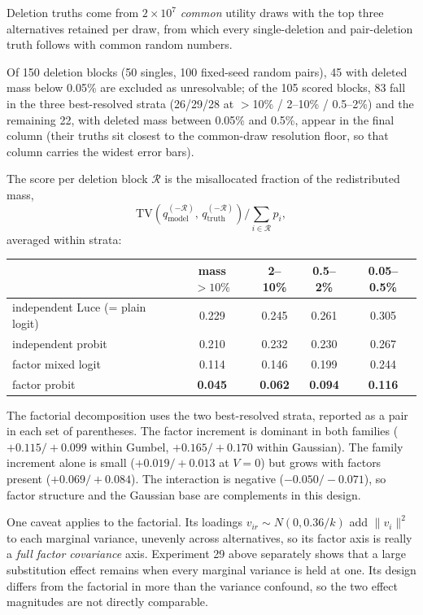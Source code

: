 \documentclass[12pt]{article}
\theoremstyle{remark}
\begin{document}
Deletion truths come from $2\times10^7$ \emph{common} utility draws with
the top three alternatives retained per draw, from which every
single-deletion and pair-deletion truth follows with common random numbers.

Of 150 deletion blocks (50 singles, 100 fixed-seed random pairs), 45 with
deleted mass below 0.05\% are excluded as unresolvable; of the 105 scored
blocks, 83 fall in the three best-resolved strata (26/29/28 at $>$10\% /
2--10\% / 0.5--2\%) and the remaining 22, with deleted mass between
0.05\% and 0.5\%, appear in the final column (their truths sit closest to
the common-draw resolution floor, so that column carries the widest error
bars).

The score per deletion block $\mathcal{R}$ is the
misallocated fraction of the redistributed mass,
\[
\mathrm{TV}\!\left(q^{(-\mathcal{R})}_{\mathrm{model}},\,
q^{(-\mathcal{R})}_{\mathrm{truth}}\right) \Big/ \textstyle\sum_{i \in \mathcal{R}} p_i ,
\]
averaged within strata:

\begin{center}
\begin{tabular}{lcccc}
\toprule
 & mass $>10\%$ & 2--10\% & 0.5--2\% & 0.05--0.5\% \\
\midrule
independent Luce (= plain logit) & 0.229 & 0.245 & 0.261 & 0.305 \\
independent probit & 0.210 & 0.232 & 0.230 & 0.267 \\
factor mixed logit & 0.114 & 0.146 & 0.199 & 0.244 \\
factor probit & \textbf{0.045} & \textbf{0.062} & \textbf{0.094} & \textbf{0.116} \\
\bottomrule
\end{tabular}
\end{center}

The factorial decomposition uses the two best-resolved strata, reported
as a pair in each set of parentheses. The factor increment is dominant
in both families ($+0.115/+0.099$ within Gumbel, $+0.165/+0.170$ within
Gaussian). The family increment alone is small ($+0.019/+0.013$ at $V =
0$) but grows with factors present ($+0.069/+0.084$). The interaction
is negative ($-0.050/-0.071$), so factor structure and the Gaussian
base are complements in this design.

One caveat applies to the factorial. Its loadings $v_{ir} \sim N(0,
0.36/k)$ add $\|v_i\|^2$ to each marginal variance, unevenly across
alternatives, so its factor axis is really a \emph{full factor
covariance} axis. Experiment 29 above separately shows that a large
substitution effect remains when every marginal variance is held at
one. Its design differs from the factorial in more than the variance
confound, so the two effect magnitudes are not directly comparable.
\end{document}
